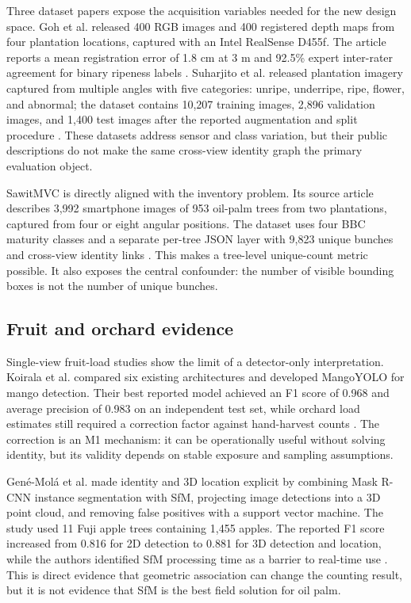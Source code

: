 Three dataset papers expose the acquisition variables needed for the new design space. Goh et al. released 400 RGB images and 400 registered depth maps from four plantation locations, captured with an Intel RealSense D455f. The article reports a mean registration error of 1.8 cm at 3 m and 92.5\% expert inter-rater agreement for binary ripeness labels \cite{goh2025palmdataset}. Suharjito et al. released plantation imagery captured from multiple angles with five categories: unripe, underripe, ripe, flower, and abnormal; the dataset contains 10,207 training images, 2,896 validation images, and 1,400 test images after the reported augmentation and split procedure \cite{suharjito2025palmdataset}. These datasets address sensor and class variation, but their public descriptions do not make the same cross-view identity graph the primary evaluation object.

SawitMVC is directly aligned with the inventory problem. Its source article describes 3,992 smartphone images of 953 oil-palm trees from two plantations, captured from four or eight angular positions. The dataset uses four BBC maturity classes and a separate per-tree JSON layer with 9,823 unique bunches and cross-view identity links \cite{indriani2026sawitmvc}. This makes a tree-level unique-count metric possible. It also exposes the central confounder: the number of visible bounding boxes is not the number of unique bunches.

\subsection{Fruit and orchard evidence}

Single-view fruit-load studies show the limit of a detector-only interpretation. Koirala et al. compared six existing architectures and developed MangoYOLO for mango detection. Their best reported model achieved an F1 score of 0.968 and average precision of 0.983 on an independent test set, while orchard load estimates still required a correction factor against hand-harvest counts \cite{koirala2019deepfruit}. The correction is an M1 mechanism: it can be operationally useful without solving identity, but its validity depends on stable exposure and sampling assumptions.

Gené-Molá et al. made identity and 3D location explicit by combining Mask R-CNN instance segmentation with SfM, projecting image detections into a 3D point cloud, and removing false positives with a support vector machine. The study used 11 Fuji apple trees containing 1,455 apples. The reported F1 score increased from 0.816 for 2D detection to 0.881 for 3D detection and location, while the authors identified SfM processing time as a barrier to real-time use \cite{genemola2020fruit3d}. This is direct evidence that geometric association can change the counting result, but it is not evidence that SfM is the best field solution for oil palm.

